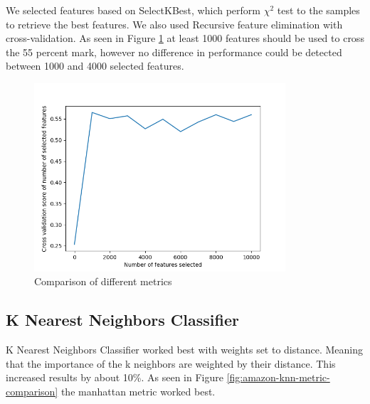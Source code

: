 We selected features based on SelectKBest, which perform ${\chi}^2$ test to the samples to retrieve the best features. We also used Recursive feature elimination with cross-validation. As seen in Figure \ref{fig:amazon-feature-selection} at least 1000 features should be used to cross the 55 percent mark, however no difference in performance could be detected between 1000 and 4000 selected features.

\begin{figure}[H]
  \begin{center}
    \includegraphics[height=7cm]{amazon/plots/rf_feature_selection.png}
    \caption{Comparison of different metrics}
    \label{fig:amazon-feature-selection}
  \end{center}
\end{figure}

\subsection{K Nearest Neighbors Classifier}

K Nearest Neighbors Classifier worked best with weights set to distance. Meaning that the importance of the k neighbors are weighted by their distance. This increased results by about 10\%. As seen in Figure \ref{fig:amazon-knn-metric-comparison} the manhattan metric worked best.


